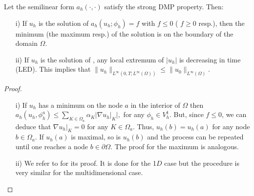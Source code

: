 \begin{lemma}
\label{lem-32}
Let the semilinear form $a_h(\cdot,\cdot)$ satisfy the strong DMP property. Then:
\begin{enumerate}
\item[i)]  If $u_h$ is the solution of $a_h(u_h;\phi_h) =f $ with $f\leq 0$ ( $f\geq 0$ resp.), then the minimum (the maximum resp.) of the solution is on the boundary of the domain $\Omega$.
\item[ii)] If  $u_h$ is the solution of , any local extremum of $|u_h|$ is decreasing in time (LED). This implies that $ \| u_h \|_{L^\infty(0,T;L^\infty(\Omega))} \leq \| u_0 \|_{L^\infty(\Omega)}$. 
\end{enumerate}
\end{lemma}
\begin{proof}
\begin{enumerate}
\item[i)] If $u_h$ has a minimum on the node $a$ in the interior of $\Omega$ then $a_h(u_h,\phi_h^a)\leq \sum_{K\in \Omega_a} \alpha_K |\nabla u_h |_K |,$ for any $ \phi_h\in V_h^1$. But, since $f \leq 0$, we can deduce that $\nabla u_h |_K = 0$ for any $K\in \Omega_a$. Thus, $u_h(b)=u_h(a)$ for any node $b\in\Omega_a$. If $u_h(a)$ is maximal, so is $u_h(b)$ and the process can be repeated until one reaches a node $b\in \partial \Omega$. The proof for the maximum is analogous. 

\item[ii)] We refer to \cite[Lemma 3.2]{burman_nonlinear_2007} for its proof. It is done for the 1$D$ case but the procedure is very similar for the multidimensional case.
\end{enumerate}

\end{proof}

